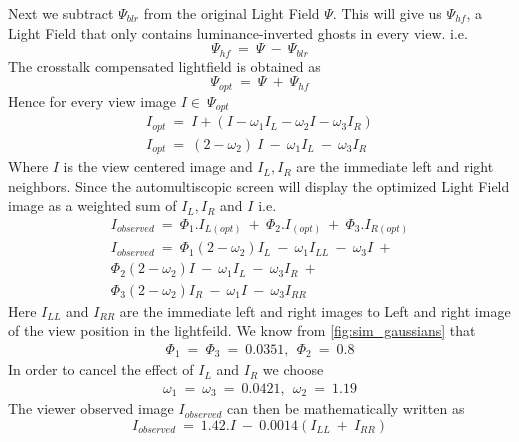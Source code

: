 Next we subtract $\Psi_{blr}$ from the original Light Field $\Psi$. This will give us  $\Psi_{hf}$, a Light Field that only contains luminance-inverted ghosts in every view. i.e.
\begin{equation}
\Psi_{hf}\: =\: \Psi\: -\: \Psi_{blr}
\end{equation}
The crosstalk compensated lightfield is obtained as
\begin{equation}
\Psi_{opt}\: =\: \Psi\: +\: \Psi_{hf}
\end{equation}
Hence for every view image $I \in\: \Psi_{opt}$
\begin{equation}
\begin{aligned}
I_{opt}\: =\:  I + (I - \omega_1I_L - \omega_2I - \omega_3I_R) \\
I_{opt}\: = \: (2-\omega_2)\ I\: -\: \omega_1I_L\: -\: \omega_3I_R
\end{aligned}
\end{equation}
Where $I$ is the view centered image and $I_L, I_R$ are the immediate left and right neighbors. Since the automultiscopic screen will display the optimized Light Field image as a weighted sum of $I_L, I_R$ and $I$ i.e.
\begin{equation}
\begin{aligned}
I_{observed}\: =\:  \Phi_1.I_{L(opt)}\: + \:\Phi_2.I_{(opt)}\: + \:\Phi_3.I_{R(opt)}       \\
I_{observed}\: = \: \Phi_1{(2-\omega_2) I_L\: -\: \omega_1I_{LL}\: -\: \omega_3I}\:+  \\
                    \Phi_2{(2-\omega_2) I\: -\: \omega_1I_{L}\: -\: \omega_3I_R}\:+   \\
                    \Phi_3{(2-\omega_2) I_R\: -\: \omega_1I\: -\: \omega_3I_{RR}}
\end{aligned}
\end{equation}
Here $I_{LL}$ and $I_{RR}$ are the immediate left and right images to Left and right image of the view position in the lightfeild. We know from \ref{fig:sim_gaussians} that
\begin{equation}
\begin{aligned}
\Phi_1\:=\: \Phi_3\:=\: 0.0351,\:\: \Phi_2\:=\:0.8
\end{aligned}
\end{equation}
In order to cancel the effect of $I_L$ and $I_R$ we choose
\begin{equation}
\begin{aligned}
\omega_1\:=\: \omega_3\:=\: 0.0421,\:\: \omega_2\:=\:1.19
\end{aligned}
\end{equation}
The viewer observed image $I_{observed}$ can then be mathematically written as
\begin{equation}
I_{observed}\: =\:  1.42.I\:-\: 0.0014(I_{LL}\:+\:I_{RR})
\label{eq:final_unsharp_obs}
\end{equation}

